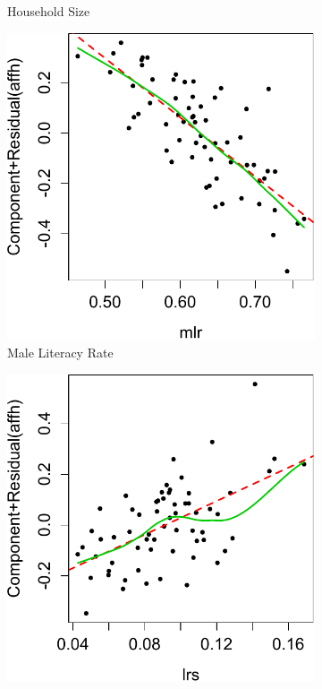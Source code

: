 \documentclass[preprint,review,12pt]{elsarticle}
\begin{document}
\begin{figure}[!htp]
\begin{subfigure}[t]{0.23\textwidth}
\caption{Household Size}
\end{subfigure}
\begin{subfigure}[t]{0.23\textwidth}
\centering
\includegraphics[width=\linewidth, keepaspectratio]{mlr.pdf}
\caption{Male Literacy Rate}
\end{subfigure}
\begin{subfigure}[t]{0.23\textwidth}
\centering
\includegraphics[width=\linewidth, keepaspectratio]{lrs.pdf}

\end{subfigure}
\end{figure}
\end{document}

